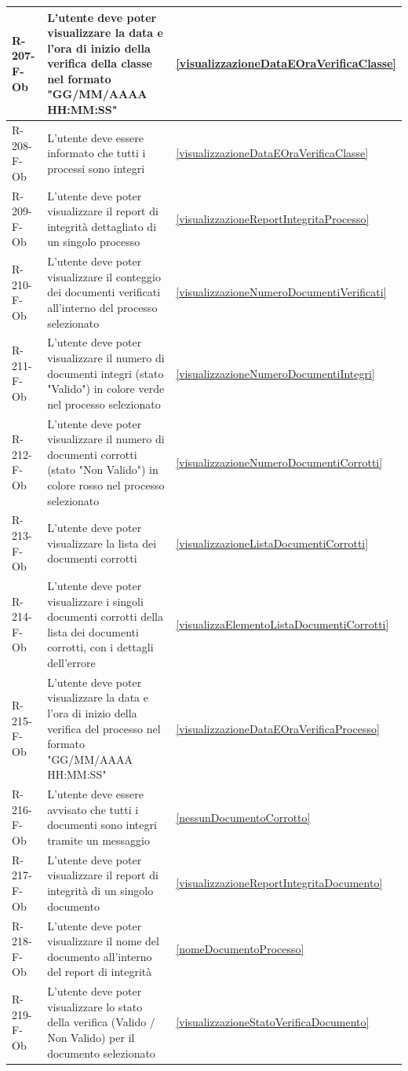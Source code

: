 \begin{longtable}{|p{2.5cm}|p{9.5cm}|p{2.5cm}|}
\hline
R-207-F-Ob & L'utente deve poter visualizzare la data e l'ora di inizio della verifica della classe nel formato "GG/MM/AAAA HH:MM:SS" & \ref{visualizzazioneDataEOraVerificaClasse} \\
\hline
R-208-F-Ob & L'utente deve essere informato che tutti i processi sono integri & \ref{visualizzazioneDataEOraVerificaClasse} \\
\hline
R-209-F-Ob & L'utente deve poter visualizzare il report di integrità dettagliato di un singolo processo & \ref{visualizzazioneReportIntegritaProcesso} \\
\hline
R-210-F-Ob & L'utente deve poter visualizzare il conteggio dei documenti verificati all'interno del processo selezionato & \ref{visualizzazioneNumeroDocumentiVerificati} \\
\hline
R-211-F-Ob & L'utente deve poter visualizzare il numero di documenti integri (stato "Valido") in colore verde nel processo selezionato & \ref{visualizzazioneNumeroDocumentiIntegri} \\
\hline
R-212-F-Ob & L'utente deve poter visualizzare il numero di documenti corrotti (stato "Non Valido") in colore rosso nel processo selezionato & \ref{visualizzazioneNumeroDocumentiCorrotti} \\
\hline
R-213-F-Ob & L'utente deve poter visualizzare la lista dei documenti corrotti & \ref{visualizzazioneListaDocumentiCorrotti} \\
\hline
R-214-F-Ob & L'utente deve poter visualizzare i singoli documenti corrotti della lista dei documenti corrotti, con i dettagli dell'errore & \ref{visualizzaElementoListaDocumentiCorrotti} \\
\hline
R-215-F-Ob & L'utente deve poter visualizzare la data e l'ora di inizio della verifica del processo nel formato "GG/MM/AAAA HH:MM:SS" & \ref{visualizzazioneDataEOraVerificaProcesso} \\
\hline
R-216-F-Ob & L'utente deve essere avvisato che tutti i documenti sono integri tramite un messaggio & \ref{nessunDocumentoCorrotto} \\
\hline
R-217-F-Ob & L'utente deve poter visualizzare il report di integrità di un singolo documento & \ref{visualizzazioneReportIntegritaDocumento} \\
\hline
R-218-F-Ob & L'utente deve poter visualizzare il nome del documento all'interno del report di integrità & \ref{nomeDocumentoProcesso} \\
\hline
R-219-F-Ob & L'utente deve poter visualizzare lo stato della verifica (Valido / Non Valido) per il documento selezionato & \ref{visualizzazioneStatoVerificaDocumento} \\

\end{longtable}
